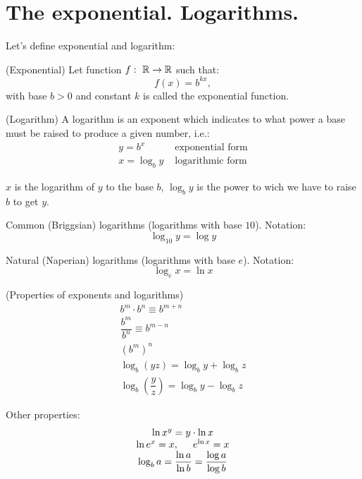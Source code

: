 \section{The exponential. Logarithms.}
Let's define exponential and logarithm:
\begin{definition}{(Exponential)}{}
    Let function $f: \ \mathbb{R} \to \mathbb{R}$ such that:
    \[
        f(x) = b^{kx},  
    \]
    with base $b > 0$ and constant $k$ is called the exponential function.
\end{definition}

\begin{definition}{(Logarithm)}{}
    A logarithm is an exponent which indicates to what power a base must be raised to produce a given number, i.e.:
    \[
        \begin{array}{cc}
            y = b^x & \text{ exponential form}\\
            x = \log_b y & \text{ logarithmic form}
        \end{array}  
    \]
\end{definition}

\begin{note}{}{}
    $x$ is the logarithm of $y$ to the base $b$, $\log_b y$ is the power to wich we have to raise $b$ to get $y$.
\end{note}

\par 
Common (Briggsian) logarithms (logarithms with base $10$). Notation:
\[
    \log_{10} y = \log y  
\]
\par 
Natural (Naperian) logarithms (logarithms with base $e$). Notation:
\[
    \log_e x = \ln x  
\]
\begin{theorema}{(Properties of exponents and logarithms)}{}
    \[
        \begin{array}{c} 
            b^m \cdot b^n \equiv b^{m+n} \\
            \dfrac{b^m}{b^n} \equiv b^{m-n}\\
            \left(b^m\right)^n\\[0.5cm] 
            \log_{b}(yz) = \log_b y + \log_b z\\
            \log_b (\dfrac{y}{z}) = \log_b y - \log_b z
        \end{array}
    \]
\end{theorema}
\begin{note}{}{}
    Other properties:
    \[
        \begin{array}{c}
            \ln x^y = y\cdot \ln x\\
            \ln e^x = x, \hspace*{0.5cm} e^{\ln x} = x\\
            \log_b a = \dfrac{\ln a}{\ln b} = \dfrac{\log a}{\log b}
        \end{array}  
    \]
\end{note}